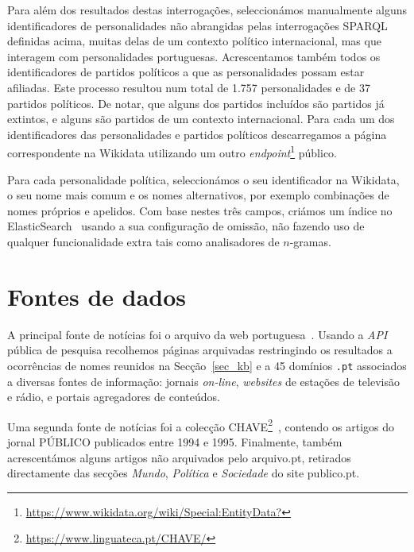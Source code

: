 \documentclass[a4paper, twocolumn, 11pt, twoside]{article}
\begin{document}
Para além dos resultados destas interrogações, seleccionámos manualmente alguns identificadores de personalidades não abrangidas pelas interrogações SPARQL definidas acima, muitas delas de um contexto político internacional, mas que interagem com personalidades portuguesas. Acrescentamos também todos os identificadores de partidos políticos a que as personalidades possam estar afiliadas. Este processo resultou num total de 1.757 personalidades e de 37 partidos políticos. De notar, que alguns dos partidos incluídos são partidos já extintos, e alguns são partidos de um contexto internacional. Para cada um dos identificadores das personalidades e partidos políticos descarregamos a página correspondente na Wikidata utilizando um outro \textit{endpoint}\footnote{\url{https://www.wikidata.org/wiki/Special:EntityData?}} público.


Para cada personalidade política, seleccionámos o seu identificador na Wikidata, o seu nome mais comum e os nomes alternativos, por exemplo combinações de nomes próprios e apelidos. Com base nestes três campos, criámos um índice no ElasticSearch~\citep{10.5555/2904394} usando a sua configuração de omissão, não fazendo uso de qualquer funcionalidade extra tais como analisadores de $n$-gramas.

\section{Fontes de dados}
\label{sec:data_sources}

A principal fonte de notícias foi o arquivo da web portuguesa~\citep{SearchPastPWA2013}. Usando a \textit{API} pública de pesquisa recolhemos páginas arquivadas restringindo os resultados a ocorrências de nomes reunidos na Secção~\ref{sec_kb} e a 45 domínios \texttt{.pt} associados a diversas fontes de informação: jornais \textit{on-line}, \textit{websites} de estações de televisão e rádio, e portais agregadores de conteúdos. 

Uma segunda fonte de notícias foi a colecção CHAVE\footnote{\url{https://www.linguateca.pt/CHAVE/}}~\citep{DBLP:conf/clef/SantosR04, santos-rocha-2001-evaluating}, contendo os artigos do jornal PÚBLICO publicados entre 1994 e 1995. Finalmente, também acrescentámos alguns artigos não arquivados pelo arquivo.pt, retirados directamente das secções {\it Mundo}, {\it Política} e {\it Sociedade} do site publico.pt. 
\end{document}
